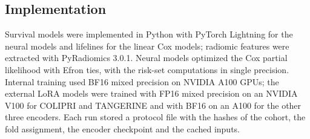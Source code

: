 \subsection{Implementation}
Survival models were implemented in Python with PyTorch Lightning for the neural models and lifelines for the linear Cox models; radiomic features were extracted with PyRadiomics 3.0.1. Neural models optimized the Cox partial likelihood with Efron ties, with the risk-set computations in single precision. Internal training used BF16 mixed precision on NVIDIA A100 GPUs; the external LoRA models were trained with FP16 mixed precision on an NVIDIA V100 for COLIPRI and TANGERINE and with BF16 on an A100 for the other three encoders. Each run stored a protocol file with the hashes of the cohort, the fold assignment, the encoder checkpoint and the cached inputs.
